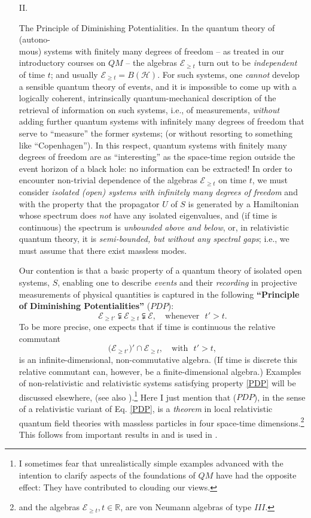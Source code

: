\documentclass[12pt]{article}
\begin{document}
\begin{enumerate}
\item[II.]{{The Principle of Diminishing Potentialities}. In the quantum theory of (autono-\\mous) systems with finitely many degrees of freedom -- as treated in our introductory courses on $QM$ -- the algebras $\mathcal{E}_{\geq t}$ turn out to be \textit{independent} of time $t$; and usually $\mathcal{E}_{\geq t}= B(\mathcal{H})$. For such systems, one \textit{cannot} develop a sensible quantum theory of events, and it is impossible to come up with a logically coherent, intrinsically quantum-mechanical description of the retrieval of information on such systems, i.e., of measurements, \textit{without} adding further quantum systems with infinitely many degrees of freedom that serve to ``measure'' the former systems; (or without resorting to something like ``Copenhagen''). In this respect, quantum systems with finitely many degrees of freedom are as ``interesting'' as the space-time region outside the event horizon of a black hole: no information can be extracted! In order to encounter non-trivial dependence of the algebras $\mathcal{E}_{\geq t}$ on time $t$, we must consider \textit{isolated (open) systems with infinitely many degrees of freedom} and with the property that the propagator $U$ of $S$ is generated by a Hamiltonian whose spectrum does \textit{not} have any isolated eigenvalues, and (if time is continuous) the spectrum is \textit{unbounded above and below}, or, in relativistic quantum theory, it is \textit{semi-bounded, but without any spectral gaps}; i.e., we must assume that there exist massless modes.

 Our contention is that a basic property of a quantum theory of isolated open systems, $S$, enabling one to describe \textit{events} and their \textit{recording} in projective measurements of physical quantities is captured in the following {\bf{``Principle of Diminishing Potentialities''}} ($PDP$):
\begin{equation}\label{PDP}
\boxed{\mathcal{E}_{\geq t'} \subsetneqq \mathcal{E}_{\geq t} \subsetneqq \mathcal{E}, \quad \text{whenever}\,\,\,\, t'>t.}
\end{equation}
To be more precise, one expects that if time is continuous the relative commutant
$$\big(\mathcal{E}_{\geq t'}\big){'} \cap \mathcal{E}_{\geq t},\quad \text{with   }\,\, t'>t,$$
is an infinite-dimensional, non-commutative algebra. (If time is discrete this relative commutant can, however, be a finite-dimensional algebra.) Examples of non-relativistic and relativistic systems satisfying property \eqref{PDP} will be discussed elsewhere, (see also \cite{Les-Diablerets}).\footnote{I sometimes fear that unrealistically simple examples advanced with the intention to clarify aspects of the foundations of $QM$ have had the opposite effect: They have contributed to clouding our views.} Here I just mention that ($PDP$), in the sense of a relativistic variant of Eq. \eqref{PDP}, is a \textit{theorem} in local relativistic quantum field theories with massless particles in four space-time dimensions.\footnote{and the algebras $\mathcal{E}_{\geq t}, t \in \mathbb{R}$, are von Neumann algebras of type $III$.} This follows from important results in \cite{Buchholz} and is used in \cite{Fr}.

}
\end{enumerate}
\end{document}
